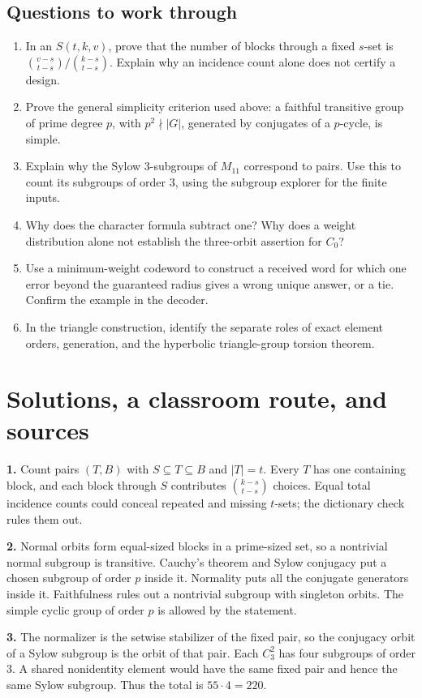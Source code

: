 \documentclass[12pt,letterpaper]{article}
\theoremstyle{definition}
\theoremstyle{remark}
\newcommand{\pageheading}[1]{\clearpage\section{#1}}
\begin{document}
\subsection*{Questions to work through}
\begin{enumerate}[label=\textbf{\arabic*.},leftmargin=*,itemsep=3pt]
\small
\item In an $S(t,k,v)$, prove that the number of blocks through a fixed $s$-set is $\binom{v-s}{t-s}/\binom{k-s}{t-s}$. Explain why an incidence count alone does not certify a design.
\item Prove the general simplicity criterion used above: a faithful transitive group of prime degree $p$, with $p^2\nmid|G|$, generated by conjugates of a $p$-cycle, is simple.
\item Explain why the Sylow 3-subgroups of $M_{11}$ correspond to pairs. Use this to count its subgroups of order 3, using the subgroup explorer for the finite inputs.
\item Why does the character formula subtract one? Why does a weight distribution alone not establish the three-orbit assertion for $C_0$?
\item Use a minimum-weight codeword to construct a received word for which one error beyond the guaranteed radius gives a wrong unique answer, or a tie. Confirm the example in the decoder.
\item In the triangle construction, identify the separate roles of exact element orders, generation, and the hyperbolic triangle-group torsion theorem.
\end{enumerate}

\pageheading{Solutions, a classroom route, and sources}
\textbf{1.} Count pairs $(T,B)$ with $S\subseteq T\subseteq B$ and $|T|=t$. Every $T$ has one containing block, and each block through $S$ contributes $\binom{k-s}{t-s}$ choices. Equal total incidence counts could conceal repeated and missing $t$-sets; the dictionary check rules them out.

\textbf{2.} Normal orbits form equal-sized blocks in a prime-sized set, so a nontrivial normal subgroup is transitive. Cauchy's theorem and Sylow conjugacy put a chosen subgroup of order $p$ inside it. Normality puts all the conjugate generators inside it. Faithfulness rules out a nontrivial subgroup with singleton orbits. The simple cyclic group of order $p$ is allowed by the statement.

\textbf{3.} The normalizer is the setwise stabilizer of the fixed pair, so the conjugacy orbit of a Sylow subgroup is the orbit of that pair. Each $C_3^2$ has four subgroups of order 3. A shared nonidentity element would have the same fixed pair and hence the same Sylow subgroup. Thus the total is $55\cdot4=220$.
\end{document}
